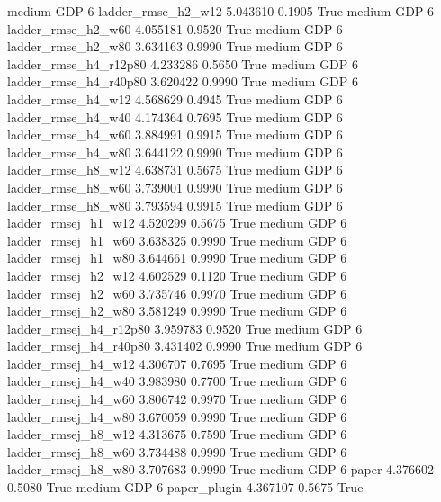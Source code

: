     medium      GDP                 6     ladder_rmse_h2_w12   5.043610      0.1905    True
    medium      GDP                 6     ladder_rmse_h2_w60   4.055181      0.9520    True
    medium      GDP                 6     ladder_rmse_h2_w80   3.634163      0.9990    True
    medium      GDP                 6  ladder_rmse_h4_r12p80   4.233286      0.5650    True
    medium      GDP                 6  ladder_rmse_h4_r40p80   3.620422      0.9990    True
    medium      GDP                 6     ladder_rmse_h4_w12   4.568629      0.4945    True
    medium      GDP                 6     ladder_rmse_h4_w40   4.174364      0.7695    True
    medium      GDP                 6     ladder_rmse_h4_w60   3.884991      0.9915    True
    medium      GDP                 6     ladder_rmse_h4_w80   3.644122      0.9990    True
    medium      GDP                 6     ladder_rmse_h8_w12   4.638731      0.5675    True
    medium      GDP                 6     ladder_rmse_h8_w60   3.739001      0.9990    True
    medium      GDP                 6     ladder_rmse_h8_w80   3.793594      0.9915    True
    medium      GDP                 6    ladder_rmsej_h1_w12   4.520299      0.5675    True
    medium      GDP                 6    ladder_rmsej_h1_w60   3.638325      0.9990    True
    medium      GDP                 6    ladder_rmsej_h1_w80   3.644661      0.9990    True
    medium      GDP                 6    ladder_rmsej_h2_w12   4.602529      0.1120    True
    medium      GDP                 6    ladder_rmsej_h2_w60   3.735746      0.9970    True
    medium      GDP                 6    ladder_rmsej_h2_w80   3.581249      0.9990    True
    medium      GDP                 6 ladder_rmsej_h4_r12p80   3.959783      0.9520    True
    medium      GDP                 6 ladder_rmsej_h4_r40p80   3.431402      0.9990    True
    medium      GDP                 6    ladder_rmsej_h4_w12   4.306707      0.7695    True
    medium      GDP                 6    ladder_rmsej_h4_w40   3.983980      0.7700    True
    medium      GDP                 6    ladder_rmsej_h4_w60   3.806742      0.9970    True
    medium      GDP                 6    ladder_rmsej_h4_w80   3.670059      0.9990    True
    medium      GDP                 6    ladder_rmsej_h8_w12   4.313675      0.7590    True
    medium      GDP                 6    ladder_rmsej_h8_w60   3.734488      0.9990    True
    medium      GDP                 6    ladder_rmsej_h8_w80   3.707683      0.9990    True
    medium      GDP                 6                  paper   4.376602      0.5080    True
    medium      GDP                 6           paper_plugin   4.367107      0.5675    True
